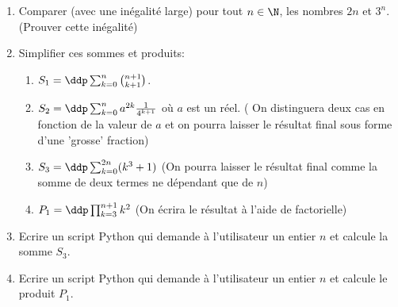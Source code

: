 \documentclass[a4paper, 11pt,reqno]{article}
\begin{document}
\newpage
\begin{exercice}
\begin{enumerate}[label=\textbf{\arabic*}.]
\item Comparer (avec une inégalité large) pour tout $n\in \N$, les nombres $2n$ et $ 3^n$. (Prouver cette inégalité) 
\item Simplifier ces sommes et produits: 
\begin{enumerate}
\item $S_1=\ddp \sum_{k=0}^{n} \binom{n+1}{k+1}$. 
\item $S_2=\ddp \sum_{k=0}^{n} a^{2k}\frac{1}{4^{k+1}}$ où $a$ est un réel. ( On distinguera deux cas en fonction de la valeur de $a$ et on pourra laisser le résultat final sous forme d'une 'grosse' fraction) 
\item $S_3=\ddp \sum_{k=0}^{2n} (k^3+1)$  (On pourra laisser le résultat final comme la somme de deux termes ne dépendant que de $n$)
\item $P_1=\ddp \prod_{k=3}^{n+1} k^2$ (On écrira le résultat à l'aide de factorielle)
\end{enumerate}
\item Ecrire un script Python qui demande à l'utilisateur un entier $n$ et calcule la somme $S_3$. 
\item Ecrire un script Python qui demande à l'utilisateur un entier $n$ et calcule le produit $P_1$.
\end{enumerate}

\end{exercice}
\end{document}
